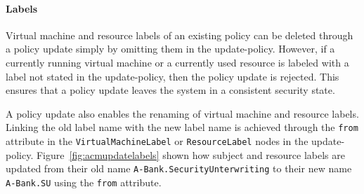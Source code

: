 \documentclass[11pt,twoside,final,openright]{report}
\begin{document}
\paragraph{Labels} Virtual machine and resource labels of an existing policy can be
deleted through a policy update simply by omitting them in the
update-policy. However, if a currently running virtual machine
or a currently used resource is labeled with a label not stated
in the update-policy, then the policy update is rejected. This
ensures that a policy update leaves the system in a consistent
security state.

A policy update also enables the renaming of virtual machine and
resource labels. Linking the old label name with the new label
name is achieved through the \verb|from| attribute in the
\verb|VirtualMachineLabel| or \verb|ResourceLabel| nodes in the
update-policy. Figure~\ref{fig:acmupdatelabels} shown how subject
and resource labels
are updated from their old name \verb|A-Bank.SecurityUnterwriting|
to their new name \verb|A-Bank.SU| using the \verb|from| attribute.
\end{document}

